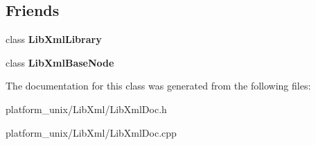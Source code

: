 \subsection*{\-Friends}
\begin{DoxyCompactItemize}
\item 
\hypertarget{classgeneral__server_1_1LibXmlDoc_ab76a8c8b514e08e13c811de729a94ce4}{class {\bfseries \-Lib\-Xml\-Library}}\label{classgeneral__server_1_1LibXmlDoc_ab76a8c8b514e08e13c811de729a94ce4}

\item 
\hypertarget{classgeneral__server_1_1LibXmlDoc_a7453902acf459394d1b514ac726ca9a2}{class {\bfseries \-Lib\-Xml\-Base\-Node}}\label{classgeneral__server_1_1LibXmlDoc_a7453902acf459394d1b514ac726ca9a2}

\end{DoxyCompactItemize}


\-The documentation for this class was generated from the following files\-:\begin{DoxyCompactItemize}
\item 
platform\-\_\-unix/\-Lib\-Xml/\-Lib\-Xml\-Doc.\-h\item 
platform\-\_\-unix/\-Lib\-Xml/\-Lib\-Xml\-Doc.\-cpp\end{DoxyCompactItemize}
